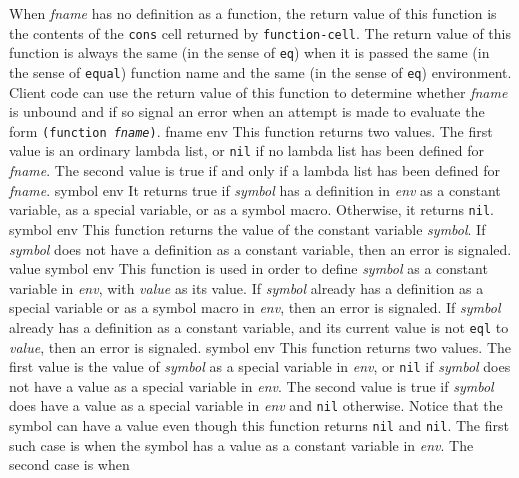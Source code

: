 When \textit{fname} has no definition as a function, the return
value of this function is the contents of the \texttt{cons} cell returned
by \texttt{function-cell}.  The return value of this function is always the
same (in the sense of \texttt{eq}) when it is passed the same (in the sense
of \texttt{equal}) function name and the same (in the sense of \texttt{eq})
environment.  Client code can use the return value of this
function to determine whether \textit{fname} is unbound and if so
signal an error when an attempt is made to evaluate the form
\texttt{(function \textrm{\textit{fname}})}.
\vskip -0.05cm
 {fname env}
\vskip -0.2cm
This function returns two values.  The first value is an ordinary
lambda list, or \texttt{nil} if no lambda list has been defined for
\textit{fname}.  The second value is true if and only if a lambda
list has been defined for \textit{fname}.
\vskip -0.05cm
 {symbol env}
\vskip -0.2cm
It returns true if \textit{symbol} has a definition in \textit{env} as a
constant variable, as a special variable, or as a symbol macro.
Otherwise, it returns \texttt{nil}.
\vskip -0.05cm
 {symbol env}
\vskip -0.2cm
This function returns the value of the constant
variable \textit{symbol}.
\vskip -0.05cm
If \textit{symbol} does not have a definition as a constant variable,
then an error is signaled.
\vskip -0.05cm
 {value symbol env}
\vskip -0.2cm
This function is used in order to define \textit{symbol} as a constant
variable in \textit{env}, with \textit{value} as its value.
\vskip -0.05cm
If \textit{symbol} already has a definition as a special variable or as a
symbol macro in \textit{env}, then an error is signaled.
\vskip -0.05cm
If \textit{symbol} already has a definition as a constant variable, and its
current value is not \texttt{eql} to \textit{value}, then an error is signaled.
\vskip -0.05cm
 {symbol env}
\vskip -0.2cm
This function returns two values.  The first value is the value of
\textit{symbol} as a special variable in \textit{env}, or \texttt{nil} if \textit{symbol}
does not have a value as a special variable in \textit{env}.  The
second value is true if \textit{symbol} does have a value as a special
variable in \textit{env} and \texttt{nil} otherwise.
\vskip -0.05cm
Notice that the symbol can have a value even though this function
returns \texttt{nil} and \texttt{nil}.  The first such case is when the symbol has a
value as a constant variable in \textit{env}.  The second case is when

